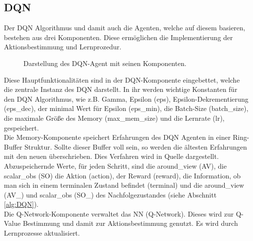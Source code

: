 \subsection{DQN} \label{sec:Konzept_DQN}
Der DQN Algorithmus und damit auch die Agenten, welche auf diesem basieren, bestehen aus drei Komponenten. Diese ermöglichen die Implementierung der Aktionsbestimmung und Lernprozedur.
\begin{figure}[H]
	\centering
	\def\svgscale{0.18}
	
	\caption[DQN-Agent]{Darstellung des DQN-Agent mit seinen Komponenten.}
	\label{fig:DQN-Agent}
\end{figure}
Diese Hauptfunktionalitäten sind in der DQN-Komponente eingebettet, welche die zentrale Instanz des DQN darstellt. In ihr werden wichtige Konstanten für den DQN Algorithmus, wie z.B. Gamma, Epsilon (eps), Epsilon-Dekrementierung (eps\_dec), der minimal Wert für Epsilon (eps\_min), die Batch-Size (batch\_size), die maximale Größe des Memory (max\_mem\_size) und die Lernrate (lr), gespeichert.\\
Die Memory-Komponente speichert Erfahrungen des DQN Agenten in einer Ring-Buffer Struktur. Sollte dieser Buffer voll sein, so werden die ältesten Erfahrungen mit den neuen überschrieben. Dies Verfahren wird in Quelle \cite[S. 5]{DBLP:journals/corr/MnihKSGAWR13} dargestellt.
Abzuspeichernde Werte, für jeden Schritt, sind die around\_view (AV), die scalar\_obs (SO) die Aktion (action), der Reward (reward), die Information, ob man sich in einem terminalen Zustand befindet (terminal) und die around\_view (AV\_) und scalar\_obs (SO\_) des Nachfolgezustandes (siehe Abschnitt \ref{alg:DQN}).\\
Die Q-Network-Komponente verwaltet das NN (Q-Network). Dieses wird zur Q-Value Bestimmung und damit zur Aktionsbestimmung genutzt. Es wird durch Lernprozesse aktualisiert.

